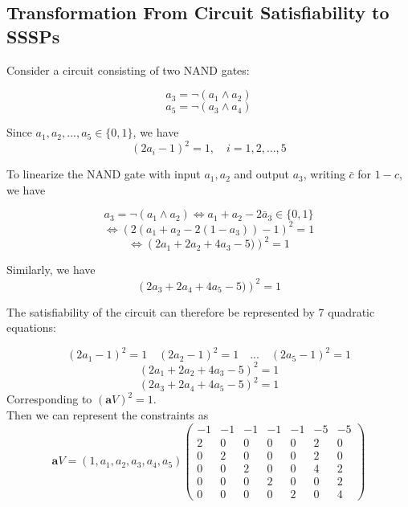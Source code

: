 \documentclass[lnbip]{svmultln}
\begin{document}
\subsection{Transformation From Circuit Satisfiability to SSSPs}
Consider a circuit consisting of two NAND gates:

 $$a_3 = \neg (a_1\wedge a_2)$$
 $$a_5 = \neg (a_3\wedge a_4)$$

Since $a_1,a_2,...,a_5 \in \{0,1\}$, we have
$$(2a_i-1)^2=1,\quad i=1,2,...,5$$

To linearize\cite{groth2012new} the NAND gate with input $a_1,a_2$ and output $a_3$, writing $\bar c$ for $1-c$, we have

$$a_3 = \neg (a_1\wedge a_2) \iff a_1 +a_2-2\bar a_3 \in  \{0,1\}$$ 
$$\iff \left(2(a_1 +a_2-2(1-a_3))-1\right)^2=1$$
$$\iff \left(2a_1 +2a_2+4a_3-5)\right)^2=1$$

Similarly, we have
$$ \left(2a_3 +2a_4+4a_5-5)\right)^2=1$$

The satisfiability of the circuit can therefore be represented by 7 quadratic equations:

$$(2a_1-1)^2 =1 \quad (2a_2-1)^2 =1 \quad ... \quad (2a_5-1)^2 =1$$
$$(2a_1+2a_2+4a_3-5)^2=1$$
$$(2a_3+2a_4+4a_5-5)^2=1$$
Corresponding to $(\textbf{a} V)^2=1$.\\

Then we can represent the constraints as 
$$\textbf{a}V=(1,a_1,a_2,a_3,a_4,a_5)
\begin{pmatrix} 
-1 & -1 & -1 & -1 & -1 & -5 & -5 \\
2 & 0 & 0 & 0 & 0 & 2 & 0 \\
0 & 2 & 0 & 0 & 0 & 2 & 0 \\
0 & 0 & 2 & 0 & 0 & 4 & 2 \\
0 & 0 & 0 & 2 & 0 & 0 & 2 \\
0 & 0 & 0 & 0 & 2 & 0 & 4 
\end{pmatrix}
$$
\end{document}
